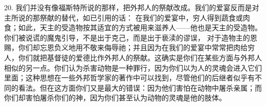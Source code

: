 20. 我们并没有像福斯特所说的那样，把外邦人的祭献改成。我们的爱宴反而是对主所说的那祭献的替代，如已引用的话： 在我们的爱宴中，穷人得到蔬食或肉食；如此，天主的受造物按其适宜的方式被用来滋养人——他也是天主的受造物。你们被说谎的魔鬼引导，不是出于克己，而是出于亵渎的谬误，  对于造物主的恩赐，你们却忘恩负义地用不敬来侮辱祂；并且因为在我们的爱宴中常常把肉给穷人，你们就把基督徒的爱德比作外邦人的祭献。这确实是你们在某些方面与外邦人相似的另一点。你们认为杀害动物是一种罪行，因为你们以为人的灵魂会进入它们里面；这种思想在一些外邦哲学家的著作中可以找到，尽管他们的后继者似乎有不同的看法。但在这方面你们又是最大的错误：因为他们害怕在动物中屠杀亲属；而你们却害怕屠杀你们的神，因为你们甚至认为动物的灵魂是他的肢体。\par


